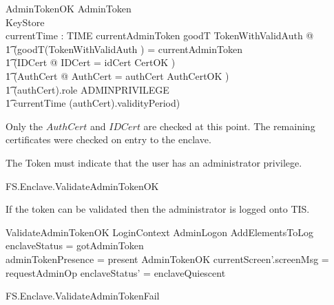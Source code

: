 \begin{schema}{AdminTokenOK}
        AdminToken
\\      KeyStore
\\      currentTime : TIME        
\where
        currentAdminToken \in \ran goodT
\also
        \exists TokenWithValidAuth @
\\ \t1  (goodT(\theta TokenWithValidAuth )  = currentAdminToken
\\ \t1  \land (\exists IDCert @ \theta IDCert = idCert \land CertOK )
\\ \t1  \land (\exists AuthCert @ \theta AuthCert = \The authCert \land
AuthCertOK )
\\ \t1  \land (\The authCert).role \in ADMINPRIVILEGE 
\\ \t1  \land currentTime \in (\The authCert).validityPeriod)
\end{schema}
\begin{Zcomment}
\item
Only the $AuthCert$  and $IDCert$ are checked at this point. The remaining
certificates were checked on entry to the enclave.
\item
The Token must indicate that the user has an administrator privilege.
\end{Zcomment}

\begin{traceunit}{FS.Enclave.ValidateAdminTokenOK}
\end{traceunit}


If the token can be validated then the administrator is logged onto
TIS.

\begin{schema}{ValidateAdminTokenOK}
        LoginContext
\also
        AdminLogon
\also
        AddElementsToLog
\where
        enclaveStatus = gotAdminToken
\\      adminTokenPresence = present
\also
        AdminTokenOK
\also   
        currentScreen'.screenMsg = requestAdminOp 
\also
        enclaveStatus' = enclaveQuiescent
\end{schema}

\begin{traceunit}{FS.Enclave.ValidateAdminTokenFail}
\end{traceunit}

